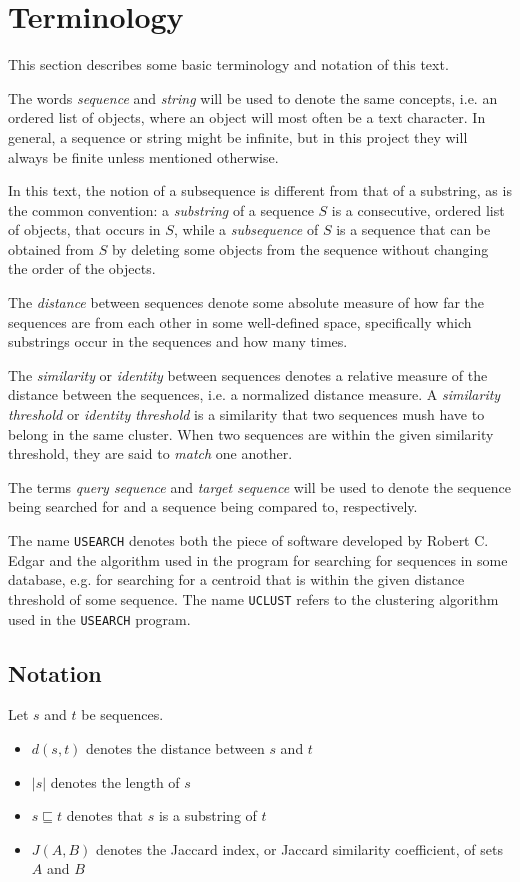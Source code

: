 \section{Terminology}

This section describes some basic terminology and notation of this text.

The words \emph{sequence} and \emph{string} will be used to denote the same
concepts, i.e. an ordered list of objects, where an object will most often be a
text character. In general, a sequence or string might be infinite, but in this
project they will always be finite unless mentioned otherwise.

In this text, the notion of a subsequence is different from that of a
substring, as is the common convention: a \emph{substring} of a sequence $S$ is
a consecutive, ordered list of objects, that occurs in $S$, while a
\emph{subsequence} of $S$ is a sequence that can be obtained from $S$ by
deleting some objects from the sequence without changing the order of the
objects.

The \emph{distance} between sequences denote some absolute measure of how far
the sequences are from each other in some well-defined space, specifically
which substrings occur in the sequences and how many times.

The \emph{similarity} or \emph{identity} between sequences denotes a relative
measure of the distance between the sequences, i.e. a normalized distance
measure. A \emph{similarity threshold} or \emph{identity threshold} is a
similarity that two sequences mush have to belong in the same cluster.  When
two sequences are within the given similarity threshold, they are said to
\emph{match} one another.

The terms \emph{query sequence} and \emph{target sequence} will be used to
denote the sequence being searched for and a sequence being compared to,
respectively.

The name \texttt{USEARCH} denotes both the piece of software developed by
Robert C. Edgar and the algorithm used in the program for searching for
sequences in some database, e.g. for searching for a centroid that is within
the given distance threshold of some sequence. The name \texttt{UCLUST} refers
to the clustering algorithm used in the \texttt{USEARCH} program.


\subsection{Notation}
Let $s$ and $t$ be sequences.
\begin{itemize}
  \item $d(s,t)$ denotes the distance between $s$ and $t$
  \item $|s|$ denotes the length of $s$
  \item $s \sqsubseteq t$ denotes that $s$ is a substring of $t$
  \item $J(A,B)$ denotes the Jaccard index, or Jaccard similarity coefficient,
    of sets $A$ and $B$
\end{itemize}
